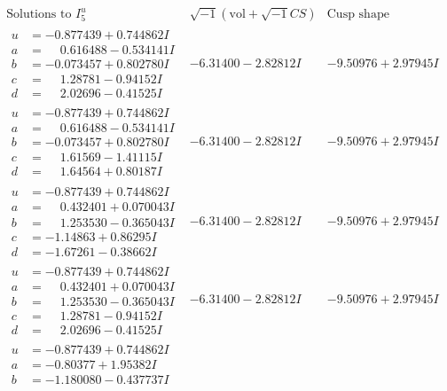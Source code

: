 \documentclass[1p]{elsarticle_modified}
\theoremstyle{definition}
\newcommand{\I}{\sqrt{-1}}
\begin{document}
$$\begin{array}{c|c|c}  
\text{Solutions to }I^u_{5}& \I (\text{vol} + \sqrt{-1}CS) & \text{Cusp shape}\\
 \hline 
\begin{aligned}
u &= -0.877439 + 0.744862 I \\
a &= \phantom{-}0.616488 - 0.534141 I \\
b &= -0.073457 + 0.802780 I \\
c &= \phantom{-}1.28781 - 0.94152 I \\
d &= \phantom{-}2.02696 - 0.41525 I\end{aligned}
 & -6.31400 - 2.82812 I & -9.50976 + 2.97945 I \\ \hline\begin{aligned}
u &= -0.877439 + 0.744862 I \\
a &= \phantom{-}0.616488 - 0.534141 I \\
b &= -0.073457 + 0.802780 I \\
c &= \phantom{-}1.61569 - 1.41115 I \\
d &= \phantom{-}1.64564 + 0.80187 I\end{aligned}
 & -6.31400 - 2.82812 I & -9.50976 + 2.97945 I \\ \hline\begin{aligned}
u &= -0.877439 + 0.744862 I \\
a &= \phantom{-}0.432401 + 0.070043 I \\
b &= \phantom{-}1.253530 - 0.365043 I \\
c &= -1.14863 + 0.86295 I \\
d &= -1.67261 - 0.38662 I\end{aligned}
 & -6.31400 - 2.82812 I & -9.50976 + 2.97945 I \\ \hline\begin{aligned}
u &= -0.877439 + 0.744862 I \\
a &= \phantom{-}0.432401 + 0.070043 I \\
b &= \phantom{-}1.253530 - 0.365043 I \\
c &= \phantom{-}1.28781 - 0.94152 I \\
d &= \phantom{-}2.02696 - 0.41525 I\end{aligned}
 & -6.31400 - 2.82812 I & -9.50976 + 2.97945 I \\ \hline\begin{aligned}
u &= -0.877439 + 0.744862 I \\
a &= -0.80377 + 1.95382 I \\
b &= -1.180080 - 0.437737 I \\

\end{aligned}
\end{array}$$
\end{document}
